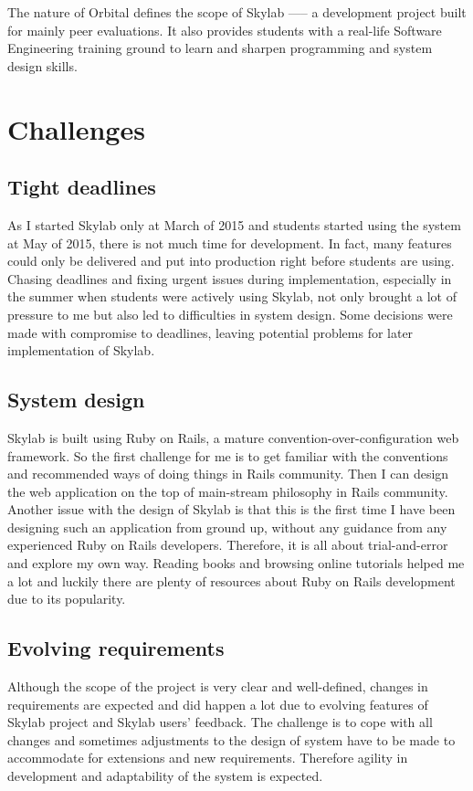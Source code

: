 The nature of Orbital defines the scope of Skylab —-- a development project built for mainly peer evaluations. It also provides students with a real-life Software Engineering training ground to learn and sharpen programming and system design skills.

\section{Challenges}

\subsection{Tight deadlines}
As I started Skylab only at March of 2015 and students started using the system at May of 2015, there is not much time for development. In fact, many features could only be delivered and put into production right before students are using. Chasing deadlines and fixing urgent issues during implementation, especially in the summer when students were actively using Skylab, not only brought a lot of pressure to me but also led to difficulties in system design. Some decisions were made with compromise to deadlines, leaving potential problems for later implementation of Skylab.

\subsection{System design}
Skylab is built using Ruby on Rails, a mature convention-over-configuration web framework. So the first challenge for me is to get familiar with the conventions and recommended ways of doing things in Rails community. Then I can design the web application on the top of main-stream philosophy in Rails community. Another issue with the design of Skylab is that this is the first time I have been designing such an application from ground up, without any guidance from any experienced Ruby on Rails developers. Therefore, it is all about trial-and-error and explore my own way. Reading books and browsing online tutorials helped me a lot and luckily there are plenty of resources about Ruby on Rails development due to its popularity.

\subsection{Evolving requirements}
Although the scope of the project is very clear and well-defined, changes in requirements are expected and did happen a lot due to evolving features of Skylab project and Skylab users' feedback. The challenge is to cope with all changes and sometimes adjustments to the design of system have to be made to accommodate for extensions and new requirements. Therefore agility in development and adaptability of the system is expected.

